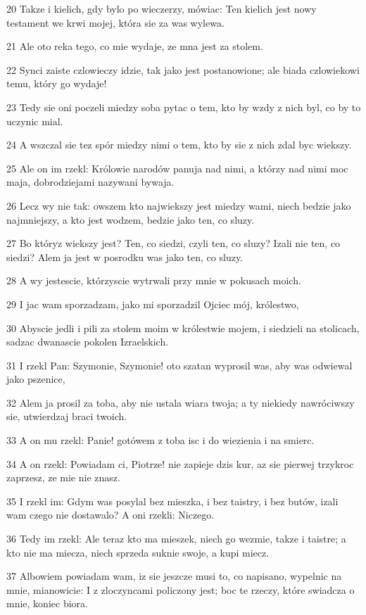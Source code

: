 \par 20 Takze i kielich, gdy bylo po wieczerzy, mówiac: Ten kielich jest nowy testament we krwi mojej, która sie za was wylewa.
\par 21 Ale oto reka tego, co mie wydaje, ze mna jest za stolem.
\par 22 Synci zaiste czlowieczy idzie, tak jako jest postanowione; ale biada czlowiekowi temu, który go wydaje!
\par 23 Tedy sie oni poczeli miedzy soba pytac o tem, kto by wzdy z nich byl, co by to uczynic mial.
\par 24 A wszczal sie tez spór miedzy nimi o tem, kto by sie z nich zdal byc wiekszy.
\par 25 Ale on im rzekl: Królowie narodów panuja nad nimi, a którzy nad nimi moc maja, dobrodziejami nazywani bywaja.
\par 26 Lecz wy nie tak: owszem kto najwiekszy jest miedzy wami, niech bedzie jako najmniejszy, a kto jest wodzem, bedzie jako ten, co sluzy.
\par 27 Bo któryz wiekszy jest? Ten, co siedzi, czyli ten, co sluzy? Izali nie ten, co siedzi? Alem ja jest w posrodku was jako ten, co sluzy.
\par 28 A wy jestescie, którzyscie wytrwali przy mnie w pokusach moich.
\par 29 I jac wam sporzadzam, jako mi sporzadzil Ojciec mój, królestwo,
\par 30 Abyscie jedli i pili za stolem moim w królestwie mojem, i siedzieli na stolicach, sadzac dwanascie pokolen Izraelskich.
\par 31 I rzekl Pan: Szymonie, Szymonie! oto szatan wyprosil was, aby was odwiewal jako pszenice,
\par 32 Alem ja prosil za toba, aby nie ustala wiara twoja; a ty niekiedy nawróciwszy sie, utwierdzaj braci twoich.
\par 33 A on mu rzekl: Panie! gotówem z toba isc i do wiezienia i na smierc.
\par 34 A on rzekl: Powiadam ci, Piotrze! nie zapieje dzis kur, az sie pierwej trzykroc zaprzesz, ze mie nie znasz.
\par 35 I rzekl im: Gdym was posylal bez mieszka, i bez taistry, i bez butów, izali wam czego nie dostawalo? A oni rzekli: Niczego.
\par 36 Tedy im rzekl: Ale teraz kto ma mieszek, niech go wezmie, takze i taistre; a kto nie ma miecza, niech sprzeda suknie swoje, a kupi miecz.
\par 37 Albowiem powiadam wam, iz sie jeszcze musi to, co napisano, wypelnic na mnie, mianowicie: I z zloczyncami policzony jest; boc te rzeczy, które swiadcza o mnie, koniec biora.
